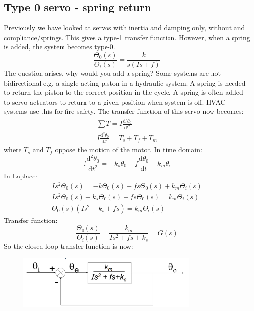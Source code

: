 \documentclass[class=report, crop=false, 12pt,a4paper]{standalone}
\begin{document}
\subsection{Type 0 servo - spring return}
Previously we have looked at servos with inertia and damping only, without and compliance/springs. This gives a type-1 transfer function. However, when a spring is added, the system becomes type-0.
\begin{equation}
  \frac{\Theta_0(s)}{\Theta_i(s)} = \frac{k}{s(Is + f)}
\end{equation}
The question arises, why would you add a spring? Some systems are not bidirectional e.g. a single acting piston in a hydraulic system. A spring is needed to return the piston to the correct position in the cycle. A spring is often added to servo actuators to return to a given position when system is off. HVAC systems use this for fire safety. The transfer function of this servo now becomes:
\begin{gather}
  \sum T = I \frac{\textrm{d}^2 \theta_0}{\textrm{d} t^2}\\
  I \frac{\textrm{d}^2 \theta_0}{\textrm{d}t^2} = T_s + T_f + T_m
\end{gather}
where $T_s$ and $T_f$ oppose the motion of the motor. In time domain:
\begin{equation}
  I \frac{\textrm{d}^2 \theta_0}{\textrm{d}t^2} = - k_s \theta_0 - f \frac{\textrm{d}\theta_0}{\textrm{d} t} + k_m \theta_i
\end{equation}
In Laplace:
\begin{gather}
  Is^2\Theta_0(s) = -k\Theta_0(s) - fs\Theta_0(s)+ k_m\Theta_i(s)\\
  Is^2 \Theta_0(s) + k_s \Theta_0(s) + fs\Theta_0(s) = k_m \Theta_i(s)\\
  \Theta_0(s) \left(Is^2 + k_s + fs\right) = k_m \Theta_i(s)
\end{gather}
Transfer function:
\begin{equation}
  \frac{\Theta_0(s)}{\Theta_i(s)} = \frac{k_m}{Is^2 + fs + k_s} = G(s)
\end{equation}
So the closed loop transfer function is now:
\begin{figure}[H]
  \centerline{\includegraphics[width = 0.8\textwidth]{../img/diagram108.png}}
  \caption{}
\end{figure}
\end{document}

